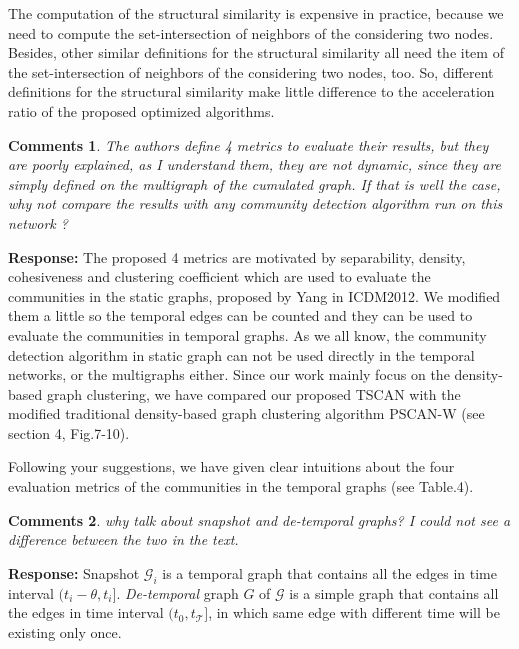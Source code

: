 \documentclass{article}
\newtheorem{Comments}{\textbf{Comments}}
\begin{document}
The computation of the structural similarity is expensive in practice, because we need to compute the set-intersection of neighbors of the considering two nodes. Besides, other similar definitions for the structural similarity all need the item of the set-intersection of neighbors of the considering two nodes, too. So, different definitions for the structural similarity make little difference to the acceleration ratio of the proposed optimized algorithms.

\begin{Comments}	
	The authors define 4 metrics to evaluate their results, but they are poorly explained, as I understand them, they are not dynamic, since they are simply defined on the multigraph of the cumulated graph. If that is well the case, why not compare the results with any community detection algorithm run on this network ?
\end{Comments}
\noindent \textbf{Response: } The proposed 4 metrics are motivated by separability, density, cohesiveness and clustering coefficient which are used to evaluate the communities in the static graphs, proposed by Yang in ICDM2012. We modified them a little so the temporal edges can be counted and they can be used to evaluate the communities in temporal graphs. As we all know, the community detection algorithm in static graph can not be used directly in the temporal networks, or the multigraphs either. 
Since our work mainly focus on the density-based graph clustering, we have compared our proposed TSCAN with the modified traditional density-based graph clustering algorithm PSCAN-W (see section 4, Fig.7-10).

Following your suggestions, we have given clear intuitions about the four evaluation metrics of the communities in the temporal graphs (see Table.4).


\begin{Comments}	
	why talk about snapshot and de-temporal graphs? I could not see a difference between the two in the text.
\end{Comments}
\noindent \textbf{Response: } %
Snapshot ${\mathcal G}_i$ is a temporal graph that contains all the edges in time interval $(t_i-\theta, t_i]$. \emph{De-temporal} graph $G$ of $\mathcal{G}$ is a simple graph that contains all the edges in time interval $(t_0, t_{\mathcal{T}}]$, in which same edge with different time will be existing only once. 
\end{document}
